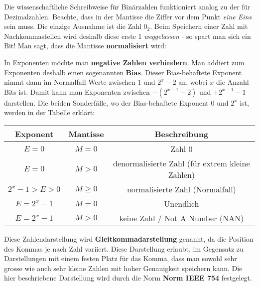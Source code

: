 Die wissenschaftliche Schreibweise für Binärzahlen funktioniert analog zu der für Dezimalzahlen. Beachte, dass in der Mantisse die Ziffer vor dem Punkt \textit{eine Eins} sein muss. Die einzige Ausnahme ist die Zahl $0_2$. Beim Speichern einer Zahl mit Nachkommastellen wird deshalb diese erste $1$ \textit{weggelassen} - so spart man sich ein Bit! Man sagt, dass die Mantisse \textbf{normalisiert} wird:

In Exponenten möchte man \textbf{negative Zahlen verhindern}. Man addiert zum Exponenten deshalb einen sogenannten \textbf{Bias}. Dieser Bias-behaftete Exponent nimmt dann im Normalfall Werte zwischen $1$ und $2^x-2$ an, wobei $x$ die Anzahl Bits ist. Damit kann man Exponenten zwischen $-(2^{x-1}-2)$ und $+2^{x-1}-1$ darstellen. Die beiden Sonderfälle, wo der Bias-behaftete Exponent $0$ und $2^x$ ist, werden in der Tabelle erklärt:

\begin{table}[H]
	\centering
	\renewcommand{\arraystretch}{1.5}
	\begin{tabular}{|c|c|c|}
	\hline
	\rowcolor[HTML]{FFCE93} 
	\textbf{Exponent} & \textbf{Mantisse} & \textbf{Beschreibung} \\ \hline
	$E = 0$ & $M = 0$ & Zahl $0$ \\ \hline
	$E = 0$ & $M > 0$ &  denormalisierte Zahl (für extrem kleine Zahlen) \\ \hline
	$2^x-1 > E > 0$ & $M \geq 0$ & normalisierte Zahl (Normalfall) \\ \hline
	$E = 2^x-1$ & $M = 0$ & Unendlich \\ \hline
	$E = 2^x-1$ & $M > 0$ & keine Zahl / Not A Number (NAN) \\ \hline
	\end{tabular}
\end{table}

Diese Zahlendarstellung wird \textbf{Gleitkommadarstellung} genannt, da die Position des Kommas je nach Zahl variiert. Diese Darstellung erlaubt, im Gegensatz zu Darstellungen mit einem festen Platz für das Komma, dass man sowohl sehr grosse wie auch sehr kleine Zahlen mit hoher Genauigkeit speichern kann. Die hier beschriebene Darstellung wird durch die Norm \textbf{Norm IEEE 754} festgelegt.

\newpage

